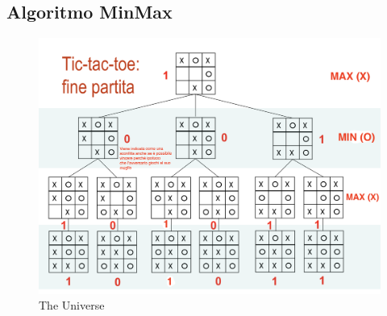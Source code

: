 \documentclass{article}
\begin{document}
\subsection{Algoritmo MinMax}
\begin{figure}[h!]
\centering
\includegraphics[scale=0.45]{Images/minmaxtictactoe.png}
\caption{The Universe}
\end{figure}
\end{document}
